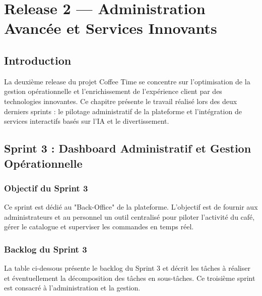 \chapter{Release 2 — Administration Avancée et Services Innovants}

\section{Introduction}
La deuxième release du projet Coffee Time se concentre sur l'optimisation de la gestion opérationnelle et l'enrichissement de l'expérience client par des technologies innovantes. Ce chapitre présente le travail réalisé lors des deux derniers sprints : le pilotage administratif de la plateforme et l'intégration de services interactifs basés sur l'IA et le divertissement.

\section{Sprint 3 : Dashboard Administratif et Gestion Opérationnelle}

\subsection{Objectif du Sprint 3}
Ce sprint est dédié au "Back-Office" de la plateforme. L'objectif est de fournir aux administrateurs et au personnel un outil centralisé pour piloter l'activité du café, gérer le catalogue et superviser les commandes en temps réel.

\subsection{Backlog du Sprint 3}
La table ci-dessous présente le backlog du Sprint 3 et décrit les tâches à réaliser et éventuellement la décomposition des tâches en sous-tâches. Ce troisième sprint est consacré à l'administration et la gestion.

